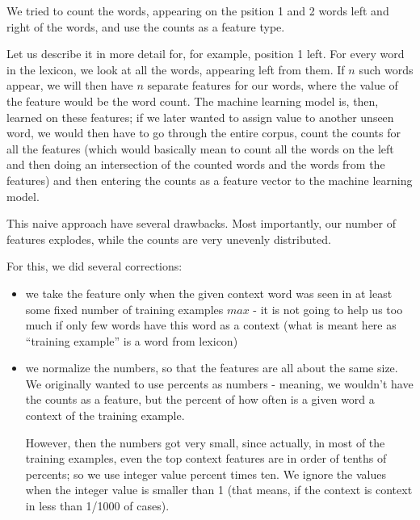 \documentclass[letterpaper]{article}
\begin{document}
We tried to count the words, appearing on the psition 1 and 2 words left and right of the words, and use the counts as a feature type.

Let us describe it in more detail for, for example, position 1 left. For every word in the lexicon, we look at all the words, appearing left from them. If $n$ such words appear, we will then have $n$ separate features for our words, where the value of the feature would be the word count. The machine learning model is, then, learned on these features; if we later wanted to assign value to another unseen word, we would then have to go through the entire corpus, count the counts for all the features (which would basically mean to count all the words on the left and then doing an intersection of the counted words and the words from the features) and then entering the counts as a feature vector to the machine learning model.

This naive approach have several drawbacks. Most importantly, our number of features explodes, while the counts are very unevenly distributed.

For this, we did several corrections:
\begin{itemize}
    \item we take the feature only when the given context word was seen in at least some fixed number of training examples $max$ - it is not going to help us too much if only few words have this word as a context (what is meant here as ``training example'' is a word from lexicon)
    
    \item we normalize the numbers, so that the features are all about the same size. We originally wanted to use percents as numbers - meaning, we wouldn't have the counts as a feature, but the percent of how often is a given word a context of the training example.
    
     However, then the numbers got very small, since actually, in most of the training examples, even the top context features are in order of tenths of percents; so we use integer value percent times ten. We ignore the values when the integer value is smaller than 1 (that means, if the context is context in less than 1/1000 of cases).
     

\end{itemize}
\end{document}
